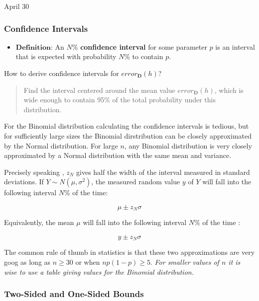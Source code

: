 \univlogo

{\Huge April 30}\vspace{5mm}

\hypertarget{confidence-intervals}{%
\subsubsection{Confidence Intervals}\label{confidence-intervals}}

\begin{itemize}
\item
  \(\textbf{Definition}\): An \(N\)\% \textbf{confidence interval} for
  some parameter \(p\) is an interval that is expected with probability
  \(N\)\% to contain \(p\).
\end{itemize}

How to derive confidence intervals for \(error_{\boldsymbol{D}}(h)\)?

\begin{quote}
Find the interval centered around the mean value
\(error_{\boldsymbol{D}}(h)\), which is wide enough to contain 95\% of
the total probability under this distribution.
\end{quote}

For the Binomial distribution calculating the confidence intervals is tedious, but for sufficiently large sizes the Binomial dirstribution
can be closely approximated by the Normal distribution. For large
\(n\), any Binomial distribution is very closely approximated by a
Normal distribution with the same mean and variance.

Precisely speaking , \(z_N\) gives half the width of the interval
measured in standard deviations. If \(Y\sim N(\mu,\sigma^2)\), the
measured random value \(y\) of \(Y\) will fall into the following
interval \(N\)\% of the time:

\[\mu\pm z_N\sigma\]

Equivalently, the mean \(\mu\) will fall into the following interval
\(N\)\% of the time :

\[y\pm z_N\sigma\]

The common rule of thumb in statistics is that these two approximations
are very goog as long as \(n\ge30\) or when \(np(1-p)\ge5\). \emph{For
smaller values of \(n\) it is wise to use a table giving values for the
Binomial distribution.}

\hypertarget{two-sided-and-one-sided-bounds}{%
\subsubsection{Two-Sided and One-Sided
Bounds}\label{two-sided-and-one-sided-bounds}}

